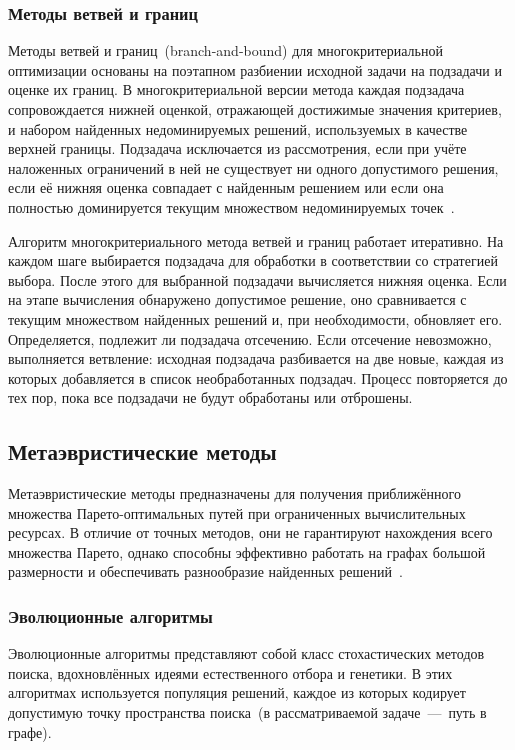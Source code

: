 \subsubsection{Методы ветвей и границ}

Методы ветвей и границ~(branch-and-bound) для многокритериальной оптимизации основаны на поэтапном разбиении
исходной задачи на подзадачи и оценке их границ. В многокритериальной версии метода каждая подзадача сопровождается нижней оценкой, отражающей достижимые значения
критериев, и набором найденных недоминируемых решений, используемых в качестве верхней границы.
Подзадача исключается из рассмотрения, если при учёте наложенных ограничений в ней не существует ни одного допустимого решения,
если её нижняя оценка совпадает с найденным решением или если она полностью доминируется
текущим множеством недоминируемых точек~\cite{bauss2023}.

Алгоритм многокритериального метода ветвей и границ работает итеративно. На каждом шаге выбирается подзадача для обработки
в соответствии со стратегией выбора. После этого для выбранной подзадачи вычисляется нижняя
оценка. Если на этапе вычисления обнаружено допустимое решение, оно сравнивается с текущим
множеством найденных решений и, при необходимости, обновляет его. Определяется, подлежит
ли подзадача отсечению. Если отсечение невозможно, выполняется ветвление: исходная подзадача
разбивается на две новые, каждая из которых добавляется в список необработанных подзадач.
Процесс повторяется до тех пор, пока все подзадачи не будут обработаны или отброшены.

\subsection{Метаэвристические методы}

Метаэвристические методы предназначены для получения приближённого множества Парето-оптимальных путей при ограниченных вычислительных ресурсах. В отличие от точных методов, они не гарантируют нахождения всего множества Парето, однако способны эффективно работать на графах большой размерности и обеспечивать разнообразие найденных решений~\cite{PangilinanJanssens2007}.

\subsubsection{Эволюционные алгоритмы}

Эволюционные алгоритмы представляют собой класс стохастических методов поиска, вдохновлённых идеями естественного отбора и генетики. В этих алгоритмах используется популяция решений, каждое из которых кодирует допустимую точку пространства поиска~(в рассматриваемой задаче~---~путь в графе).

